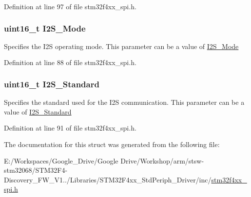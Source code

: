 Definition at line 97 of file stm32f4xx\-\_\-spi.\-h.

\hypertarget{struct_i2_s___init_type_def_ab239a97360862b2514410fef774686f5}{
\subsubsection[{I2\-S\-\_\-\-Mode}]{\setlength{\rightskip}{0pt plus 5cm}uint16\-\_\-t I2\-S\-\_\-\-Mode}}\label{struct_i2_s___init_type_def_ab239a97360862b2514410fef774686f5}
Specifies the I2\-S operating mode. This parameter can be a value of \hyperlink{struct_i2_s___init_type_def_ab239a97360862b2514410fef774686f5}{I2\-S\-\_\-\-Mode} 

Definition at line 88 of file stm32f4xx\-\_\-spi.\-h.

\hypertarget{struct_i2_s___init_type_def_a0f0c02142c68e2c2f0038ca79bdbd365}{
\subsubsection[{I2\-S\-\_\-\-Standard}]{\setlength{\rightskip}{0pt plus 5cm}uint16\-\_\-t I2\-S\-\_\-\-Standard}}\label{struct_i2_s___init_type_def_a0f0c02142c68e2c2f0038ca79bdbd365}
Specifies the standard used for the I2\-S communication. This parameter can be a value of \hyperlink{struct_i2_s___init_type_def_a0f0c02142c68e2c2f0038ca79bdbd365}{I2\-S\-\_\-\-Standard} 

Definition at line 91 of file stm32f4xx\-\_\-spi.\-h.



The documentation for this struct was generated from the following file\-:\begin{DoxyCompactItemize}
\item 
E\-:/\-Workspaces/\-Google\-\_\-\-Drive/\-Google Drive/\-Workshop/arm/stsw-\/stm32068/\-S\-T\-M32\-F4-\/\-Discovery\-\_\-\-F\-W\-\_\-\-V1../\-Libraries/\-S\-T\-M32\-F4xx\-\_\-\-Std\-Periph\-\_\-\-Driver/inc/\hyperlink{stm32f4xx__spi_8h}{stm32f4xx\-\_\-spi.\-h}\end{DoxyCompactItemize}
